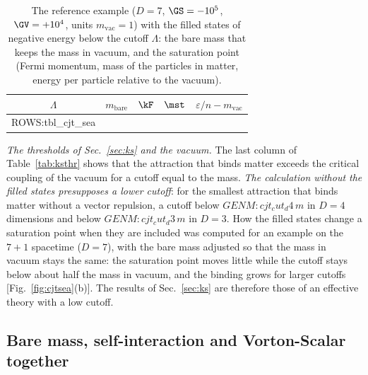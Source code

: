 \begin{table}
\caption{\label{tab:cjtsea}The reference example ($D=7$, $\GS=-10^{5}$, $\GV=+10^{4}$, units
$m_{\mathrm{vac}}=1$) with the filled states of negative energy below the cutoff $\Lambda$: the bare
mass that keeps the mass in vacuum, and the saturation point (Fermi momentum, mass of the particles
in matter, energy per particle relative to the vacuum).}
\begin{ruledtabular}
\begin{tabular}{ccccc}
$\Lambda$ & $m_{\mathrm{bare}}$ & $\kF$ & $\mst$ & $\varepsilon/n-m_{\mathrm{vac}}$ \\
\hline
{{ROWS:tbl_cjt_sea}}
\end{tabular}
\end{ruledtabular}
\end{table}
\emph{The thresholds of Sec.~\ref{sec:ks} and the vacuum.} The last column of
Table~\ref{tab:ksthr} shows that the attraction that binds matter exceeds the critical coupling of
the vacuum for a cutoff equal to the mass. \emph{The calculation without the filled states
presupposes a lower cutoff}: for the smallest attraction that binds matter without a vector
repulsion, a cutoff below ${{GENM:cjt_cut_d4}}\,m$ in $D=4$ dimensions and below
${{GENM:cjt_cut_d3}}\,m$ in $D=3$. How the filled states change a saturation point when they are
included was computed for an example on the $7+1$ spacetime ($D=7$), with the bare mass adjusted so
that the mass in vacuum stays the same: the saturation point moves little while the cutoff stays
below about half the mass in vacuum, and the binding grows for larger cutoffs
[Fig.~\ref{fig:cjtsea}(b)]. The results of Sec.~\ref{sec:ks} are therefore those of an effective
theory with a low cutoff.

\subsection{Bare mass, self-interaction and Vorton-Scalar together}
\label{sec:unified}

